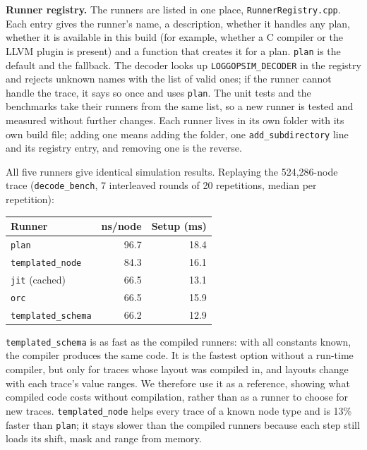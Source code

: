 \documentclass[10pt,a4paper]{article}
\begin{document}
\textbf{Runner registry.} The runners are listed in one place, \texttt{RunnerRegistry.\allowbreak{}cpp}. Each entry gives the runner's name, a description, whether it handles any plan, whether it is available in this build (for example, whether a C compiler or the LLVM plugin is present) and a function that creates it for a plan. \texttt{plan} is the default and the fallback. The decoder looks up \texttt{LOGGOPSIM\_\allowbreak{}DECODER} in the registry and rejects unknown names with the list of valid ones; if the runner cannot handle the trace, it says so once and uses \texttt{plan}. The unit tests and the benchmarks take their runners from the same list, so a new runner is tested and measured without further changes. Each runner lives in its own folder with its own build file; adding one means adding the folder, one \texttt{add\_\allowbreak{}subdirectory} line and its registry entry, and removing one is the reverse.

All five runners give identical simulation results. Replaying the 524,286-node trace (\texttt{decode\_\allowbreak{}bench}, 7 interleaved rounds of 20 repetitions, median per repetition):

\begin{center}
\begin{tabular}{lrr}
\toprule
\textbf{Runner} & \textbf{ns/node} & \textbf{Setup (ms)} \\
\midrule
\texttt{plan} & 96.7 & 18.4 \\
\texttt{templated\_node} & 84.3 & 16.1 \\
\texttt{jit} (cached) & 66.5 & 13.1 \\
\texttt{orc} & 66.5 & 15.9 \\
\texttt{templated\_schema} & 66.2 & 12.9 \\
\bottomrule
\end{tabular}
\end{center}

\texttt{templated\_schema} is as fast as the compiled runners: with all constants known, the compiler produces the same code. It is the fastest option without a run-time compiler, but only for traces whose layout was compiled in, and layouts change with each trace's value ranges. We therefore use it as a reference, showing what compiled code costs without compilation, rather than as a runner to choose for new traces. \texttt{templated\_node} helps every trace of a known node type and is 13\% faster than \texttt{plan}; it stays slower than the compiled runners because each step still loads its shift, mask and range from memory.
\end{document}
